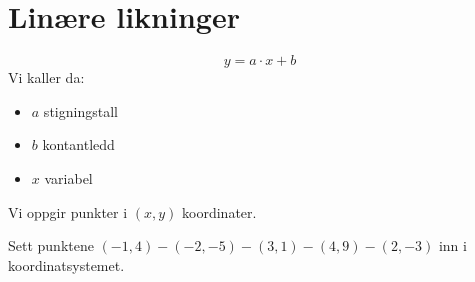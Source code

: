 \documentclass[12pt]{exam}
\begin{document}
\newpage

\section*{Linære likninger}
\[
y = a\cdot x + b
\]
Vi kaller da:
\begin{itemize}
\item $a$ stigningstall
\item $b$ kontantledd
\item $x$ variabel
\end{itemize}
Vi oppgir punkter i $(x,y)$ koordinater.

\begin{questions}
\question Sett punktene $(-1,4)-(-2,-5)-(3,1)-(4,9)-(2,-3)$ inn i koordinatsystemet.
\end{questions}
\begin{center}
\end{center}

\end{document}
